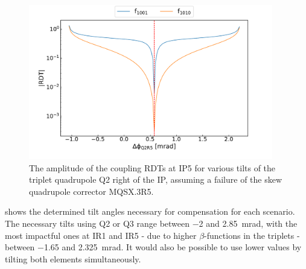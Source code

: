 \begin{figure}[!htb]
    \centering
    \includegraphics*[width=0.95\textwidth]{Figures/IR_Coupling_Correction/ir5_compensate_right_with_q2.pdf}
    \caption{The amplitude of the coupling RDTs at IP\num{5} for various tilts of the triplet quadrupole Q\num{2} right of the IP, assuming a failure of the skew quadrupole corrector MQSX.\num{3}R\num{5}.}
    \label{figure:ir5_compensate_right_with_q2}
\end{figure}

 shows the determined tilt angles necessary for compensation for each scenario.
The necessary tilts using Q\num{2} or Q\num{3} range between \num{-2} and \qty{2.85}{\milli\radian}, with the most impactful ones at IR\num{1} and IR\num{5} - due to higher \(\beta\)-functions in the triplets - between \num{-1.65} and \qty{2.325}{\milli\radian}.
It would also be possible to use lower values by tilting both elements simultaneously.

